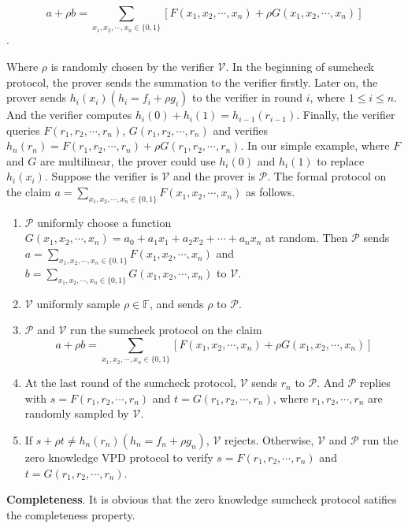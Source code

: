 $$a + \rho b = \sum\limits_{x_1, x_2, \cdots, x_n \in \{0, 1\}}[F(x_1, x_2, \cdots, x_n) + \rho G(x_1, x_2, \cdots, x_n)]$$. 

Where $\rho$ is randomly chosen by the verifier $\mathcal{V}$. In the beginning of sumcheck protocol, the prover sends the summation to the verifier firstly. Later on, the prover sends $h_i(x_i)(h_i = f_i + \rho g_i)$ to the verifier in round $i$, where $1 \leq i \leq n$. And the verifier computes $h_i(0) + h_i(1) = h_{i-1}(r_{i-1})$. Finally, the verifier queries $F(r_1, r_2, \cdots, r_n)$, $G(r_1, r_2, \cdots, r_n)$ and verifies $h_n(r_n) = F(r_1, r_2, \cdots, r_n) + \rho G(r_1, r_2, \cdots, r_n)$. In our simple example, where $F$ and $G$ are multilinear, the prover could use $h_i(0)$ and $h_i(1)$ to replace $h_i(x_i)$. Suppose the verifier is $\mathcal{V}$ and the prover is $\mathcal{P}$. The formal protocol on the claim $a = \sum\limits_{x_1, x_2, \cdots, x_n \in \{0, 1\}} F(x_1, x_2, \cdots, x_n)$ as follows.\\

\noindent
\begin{enumerate}

\item $\mathcal{P}$ uniformly choose a function $G(x_1, x_2, \cdots, x_n) = a_0 + a_1x_1 + a_2x_2 + \cdots + a_nx_n$ at random. Then $\mathcal{P}$ sends $a = \sum\limits_{x_1, x_2, \cdots, x_n \in \{0, 1\}} F(x_1, x_2, \cdots, x_n)$ and $b = \sum\limits_{x_1, x_2, \cdots, x_n \in \{0, 1\}} G(x_1, x_2, \cdots, x_n)$ to $\mathcal{V}$.
\item $\mathcal{V}$ uniformly sample $\rho \in \mathbb{F}$, and sends $\rho$ to $\mathcal{P}$.
\item $\mathcal{P}$ and $\mathcal{V}$ run the sumcheck protocol on the claim
$$a + \rho b = \sum\limits_{x_1, x_2, \cdots, x_n \in \{0, 1\}}[F(x_1, x_2, \cdots, x_n) + \rho G(x_1, x_2, \cdots, x_n)]$$
\item At the last round of the sumcheck protocol, $\mathcal{V}$ sends $r_n$ to $\mathcal{P}$. And $\mathcal{P}$ replies with $s = F(r_1, r_2, \cdots, r_n)$ and $t = G(r_1, r_2, \cdots, r_n)$, where $r_1, r_2, \cdots, r_n$ are randomly sampled by $\mathcal{V}$. 
\item If $s + \rho t \neq h_n(r_n)(h_n = f_n + \rho g_n)$, $\mathcal{V}$ rejects. Otherwise, $\mathcal{V}$ and $\mathcal{P}$ run the zero knowledge VPD protocol to verify $s = F(r_1, r_2, \cdots, r_n)$ and $t = G(r_1, r_2, \cdots, r_n)$.  

\end{enumerate}
\noindent
\textbf{Completeness}. It is obvious that the zero knowledge sumcheck protocol satifies the completeness property.\\

